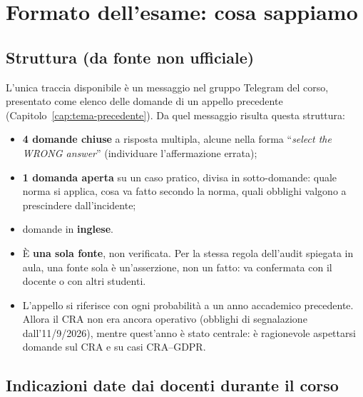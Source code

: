 \chapter{Formato dell'esame: cosa sappiamo}
\label{cap:formato}

\section{Struttura (da fonte non ufficiale)}

L'unica traccia disponibile è un messaggio nel gruppo Telegram del corso, presentato come elenco
delle domande di un appello precedente (Capitolo~\ref{cap:tema-precedente}). Da quel messaggio
risulta questa struttura:
\begin{itemize}
  \item \textbf{4 domande chiuse} a risposta multipla, alcune nella forma ``\emph{select the WRONG
    answer}'' (individuare l'affermazione errata);
  \item \textbf{1 domanda aperta} su un caso pratico, divisa in sotto-domande: quale norma si applica,
    cosa va fatto secondo la norma, quali obblighi valgono a prescindere dall'incidente;
  \item domande in \textbf{inglese}.
\end{itemize}

\begin{verifica}
\begin{itemize}
  \item È \textbf{una sola fonte}, non verificata. Per la stessa regola dell'audit spiegata in aula,
    una fonte sola è un'asserzione, non un fatto: va confermata con il docente o con altri studenti.
  \item L'appello si riferisce con ogni probabilità a un anno accademico precedente. Allora il CRA non
    era ancora operativo (obblighi di segnalazione dall'11/9/2026), mentre quest'anno è stato centrale:
    è ragionevole aspettarsi domande sul CRA e su casi CRA--GDPR.
\end{itemize}
\end{verifica}

\section{Indicazioni date dai docenti durante il corso}


